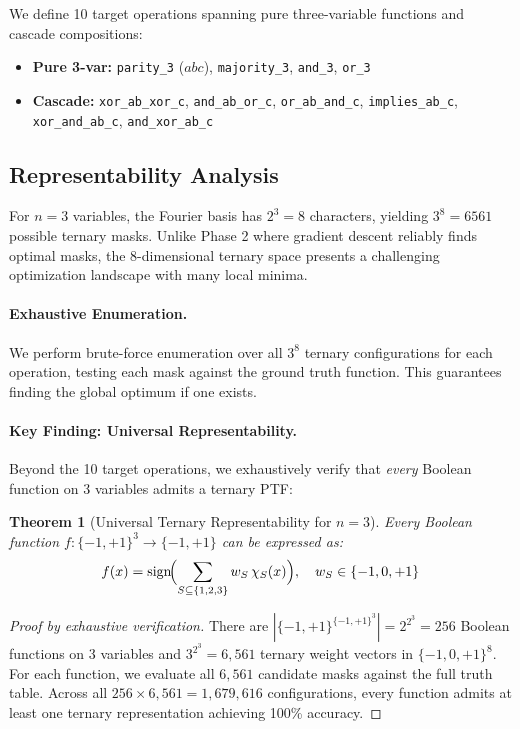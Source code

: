 \documentclass[Royal,times,sageh]{sagej}
\newcommand{\sign}{\text{sign}}
\newtheorem{theorem}{Theorem}
\begin{document}
We define 10 target operations spanning pure three-variable functions and cascade compositions:
\begin{itemize}
    \item \textbf{Pure 3-var:} \texttt{parity\_3} ($abc$), \texttt{majority\_3}, \texttt{and\_3}, \texttt{or\_3}
    \item \textbf{Cascade:} \texttt{xor\_ab\_xor\_c}, \texttt{and\_ab\_or\_c}, \texttt{or\_ab\_and\_c}, \texttt{implies\_ab\_c}, \texttt{xor\_and\_ab\_c}, \texttt{and\_xor\_ab\_c}
\end{itemize}

\subsection{Representability Analysis}

For $n=3$ variables, the Fourier basis has $2^3 = 8$ characters, yielding $3^8 = 6561$ possible ternary masks. Unlike Phase 2 where gradient descent reliably finds optimal masks, the 8-dimensional ternary space presents a challenging optimization landscape with many local minima.

\paragraph{Exhaustive Enumeration.}
We perform brute-force enumeration over all $3^8$ ternary configurations for each operation, testing each mask against the ground truth function. This guarantees finding the global optimum if one exists.

\paragraph{Key Finding: Universal Representability.}
Beyond the 10 target operations, we exhaustively verify that \emph{every} Boolean function on 3 variables admits a ternary PTF:

\begin{theorem}[Universal Ternary Representability for $n=3$]
\label{thm:ternary_n3}
Every Boolean function $f: \{-1, +1\}^3 \to \{-1, +1\}$ can be expressed as:
\begin{equation}
    f(x) = \sign\!\Bigl(\sum_{S \subseteq \{1,2,3\}} w_S \,\chi_S(x)\Bigr), \quad w_S \in \{-1, 0, +1\}
\end{equation}
\end{theorem}

\begin{proof}[Proof by exhaustive verification]
There are $|\{-1,+1\}^{\{-1,+1\}^3}| = 2^{2^3} = 256$ Boolean functions on 3 variables and $3^{2^3} = 6{,}561$ ternary weight vectors in $\{-1,0,+1\}^8$. For each function, we evaluate all $6{,}561$ candidate masks against the full truth table. Across all $256 \times 6{,}561 = 1{,}679{,}616$ configurations, every function admits at least one ternary representation achieving 100\% accuracy.
\end{proof}
\end{document}
